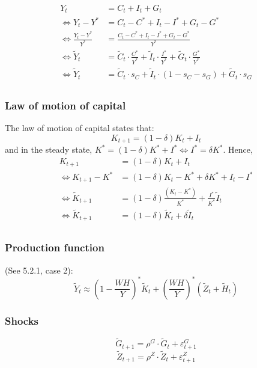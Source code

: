 \documentclass[12pt]{report}
\begin{document}
\begin{align*}
Y_t & = C_t + I_t + G_t \\
\Leftrightarrow Y_t - Y^* & = C_t - C^* + I_t - I^* + G_t - G^* \\
\Leftrightarrow \frac{Y_t - Y^*}{Y^*} & = \frac{C_t - C^* + I_t - I^* + G_t - G^*}{Y^*} \\
\Leftrightarrow \tilde Y_t  & = \tilde C_t \cdot \frac{C^*}{Y^*} + \tilde I_t \cdot \frac{I^*}{Y^*} + \tilde G_t \cdot \frac{G^*}{Y^*} \\
\Leftrightarrow \tilde Y_t  & = \tilde C_t \cdot s_C + \tilde I_t \cdot (1 - s_C - s_G) + \tilde G_t \cdot s_G \\
\end{align*}

\subsubsection{Law of motion of capital}

The law of motion of capital states that: $$K_{t+1} = (1 - \delta)K_t + I_t$$ and in the steady state, $K^* = (1 - \delta)K^* + I^* \Leftrightarrow I^* = \delta K^* $. Hence,
\begin{align*}
K_{t+1} & = (1 - \delta)K_t + I_t \\
\Leftrightarrow K_{t+1} - K^* & = (1 - \delta) K_t - K^* + \delta K^* + I_t - I^* \\
\Leftrightarrow \tilde K_{t+1} & = (1 - \delta)\frac{(K_t - K^*)}{K^*} + \frac{I^*}{K^*} \tilde I_t \\
\Leftrightarrow \tilde K_{t+1} & = (1 - \delta)\tilde K_t + \delta \tilde I_t \\
\end{align*}


\subsubsection{Production function}

(See 5.2.1, case 2):
$$\tilde{Y}_t \approx \left(1 - \frac{WH}{Y}\right)^* \tilde K_t + \left(\frac{WH}{Y}\right)^*(\tilde Z_t + \tilde H_t)$$

\subsubsection{Shocks}

$$\tilde G_{t+1} = \rho^G\cdot \tilde G_{t} + \varepsilon_{t+1}^G $$
$$\tilde Z_{t+1} = \rho^Z\cdot \tilde Z_{t} + \varepsilon_{t+1}^Z $$
\end{document}
